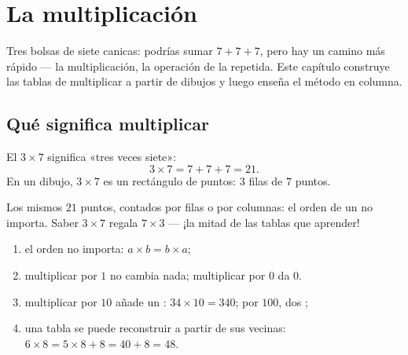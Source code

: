 \chapter{La multiplicación}\label{ch:g3:mult}

Tres bolsas de siete canicas: podrías sumar $7 + 7 + 7$, pero hay
un camino más rápido --- la multiplicación, la operación de la  repetida.
Este capítulo construye las tablas de multiplicar a partir de dibujos y luego
enseña el método en columna.

\section{Qué significa multiplicar}

\begin{definition}[La multiplicación]\label{def:g3:mult:def}
El  $3 \times 7$ significa «tres veces siete»:
\[
3 \times 7 = 7 + 7 + 7 = 21 .
\]
En un dibujo, $3 \times 7$ es un rectángulo de puntos: $3$ filas de $7$
puntos.
\end{definition}

\begin{omfigure}

{\small Los mismos $21$ puntos, contados por filas o por columnas: el orden
de un  no importa. Saber $3 \times 7$ regala
$7 \times 3$ --- ¡la mitad de las tablas que aprender!}
\end{omfigure}

\begin{proposition}[Reglas que ayudan]\label{prop:g3:mult:rules}
\begin{enumerate}
  \item el orden no importa: $a \times b = b \times a$;
  \item multiplicar por $1$ no cambia nada; multiplicar por $0$ da
        $0$.
  \item multiplicar por $10$ añade un : $34 \times 10 = 340$;
        por $100$, dos ;
  \item una tabla se puede reconstruir a partir de sus vecinas:
        $6 \times 8 = 5 \times 8 + 8 = 40 + 8 = 48$.
\end{enumerate}
\end{proposition}
\admitted

